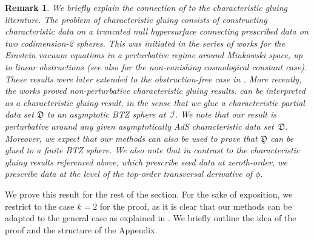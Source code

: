 \documentclass[11pt]{article}
\newtheorem{remark}{Remark}[section]
\numberwithin{equation}{section}
\begin{document}
\begin{remark}
    We briefly explain the connection of  to the characteristic gluing literature. The problem of characteristic gluing consists of constructing characteristic data on a truncated null hypersurface connecting prescribed data on two codimension-2 spheres. This was initiated in the series of works \cite{gluing1,gluing2,gluing3} for the Einstein vacuum equations in a perturbative regime around Minkowski space, up to linear obstructions (see also \cite{Lgluing1%
    } for the non-vanishing cosmological constant case). These results were later extended to the obstruction-free case in \cite{gluing4}. More recently, the works \cite{gluing5,gluing6} proved non-perturbative characteristic gluing results.  can be interpreted as a characteristic gluing result, in the sense that we glue a characteristic partial data set $\underline{\mathfrak{D}}$ to an asymptotic BTZ sphere at~$\mathcal{I}.$ We note that our result is perturbative around any given asymptotically AdS characteristic data set~$\mathfrak{D}$. Moreover, we expect that our methods can also be used to prove that $\underline{\mathfrak{D}}$ can be glued to a finite BTZ sphere. We also note that in contrast to the characteristic gluing results referenced above, which prescribe seed data at zeroth-order, we prescribe data at the level of the top-order transversal derivative of $\phi.$
\end{remark}

We prove this result for the rest of the section. For the sake of exposition, we restrict to the case $k=2$ for the proof, as it is clear that our methods can be adapted to the general case as explained in . We briefly outline the idea of the proof and the structure of the Appendix.
\end{document}
